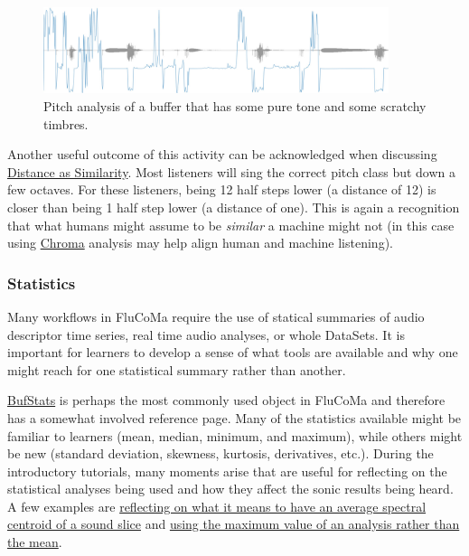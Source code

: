\documentclass{article}
\begin{document}
\begin{figure}[ht]
\centering
\includegraphics[width=0.9\textwidth]{./figures/pitch-analysis.jpg}
\caption{Pitch analysis of a buffer that has some pure tone and some scratchy timbres.}
\label{fig:pitch-analysis}
\end{figure}

Another useful outcome of this activity can be acknowledged when
discussing \href{https://learn.flucoma.org/learn/why-scale/}{Distance as
Similarity}. Most listeners will sing the correct pitch class but down a
few octaves. For these listeners, being 12 half steps lower (a distance
of 12) is closer than being 1 half step lower (a distance of one). This
is again a recognition that what humans might assume to be
\emph{similar} a machine might not (in this case using
\href{https://learn.flucoma.org/reference/chroma/}{Chroma} analysis may
help align human and machine listening).

\subsubsection{Statistics}

Many workflows in FluCoMa require the use of statical summaries of audio descriptor time series, real time audio analyses, or whole DataSets. It is important for
learners to develop a sense of what tools are available and why one
might reach for one statistical summary rather than another.

\href{https://learn.flucoma.org/reference/bufstats/}{BufStats} is
perhaps the most commonly used object in FluCoMa and therefore has a
somewhat involved reference page. Many of the statistics available might
be familiar to learners (mean, median, minimum, and maximum), while
others might be new (standard deviation, skewness, kurtosis,
derivatives, etc.). During the introductory tutorials, many moments arise that are useful for reflecting on the statistical analyses being used and how they affect the sonic results being heard. A few examples are
\href{https://youtu.be/sabA8p8Y-Xs?t=1311}{reflecting on what it means
to have an average spectral centroid of a sound slice} and
\href{https://youtu.be/qom6x1u4_6A?t=1437}{using the maximum value of an
analysis rather than the mean}.
\end{document}
